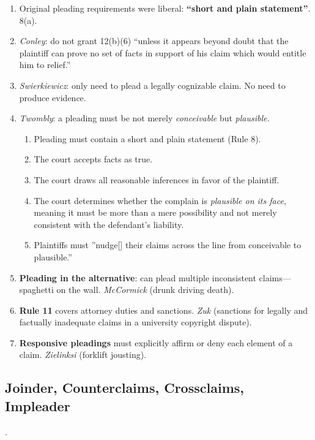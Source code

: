 \begin{enumerate}
    \item Original pleading requirements were liberal: \textbf{``short and 
    plain statement''}. 8(a).
    \item \emph{Conley}: do not grant 12(b)(6) ``unless it appears beyond 
    doubt that the plaintiff can prove no set of facts in support of his claim 
    which would entitle him to relief.''
    \item \emph{Swierkiewicz}: only need to plead a legally cognizable claim. 
    No need to produce evidence.
    \item \emph{Twombly}: a pleading must be not merely \emph{conceivable} but 
    \emph{plausible.}
    \begin{enumerate}
        \item Pleading must contain a short and plain statement (Rule 8).
        \item The court accepts facts as true.
        \item The court draws all reasonable inferences in favor of the 
        plaintiff.
        \item The court determines whether the complain is \emph{plausible on 
        its face}, meaning it must be more than a mere possibility and not 
        merely consistent with the defendant's liability.
        \item Plaintiffs must ''nudge[] their claims across the line from 
        conceivable to plausible.''
    \end{enumerate}
    \item \textbf{Pleading in the alternative}: can plead multiple 
    inconsistent claims---spaghetti on the wall. \emph{McCormick} (drunk 
    driving death).
    \item \textbf{Rule 11} covers attorney duties and sanctions.  \emph{Zuk} 
    (sanctions for legally and factually inadequate claims in a university 
    copyright dispute).
    \item \textbf{Responsive pleadings} must explicitly affirm or deny each 
    element of a claim. \emph{Zielinksi} (forklift jousting).
\end{enumerate}

\subsection{Joinder, Counterclaims, Crossclaims, Impleader}.

